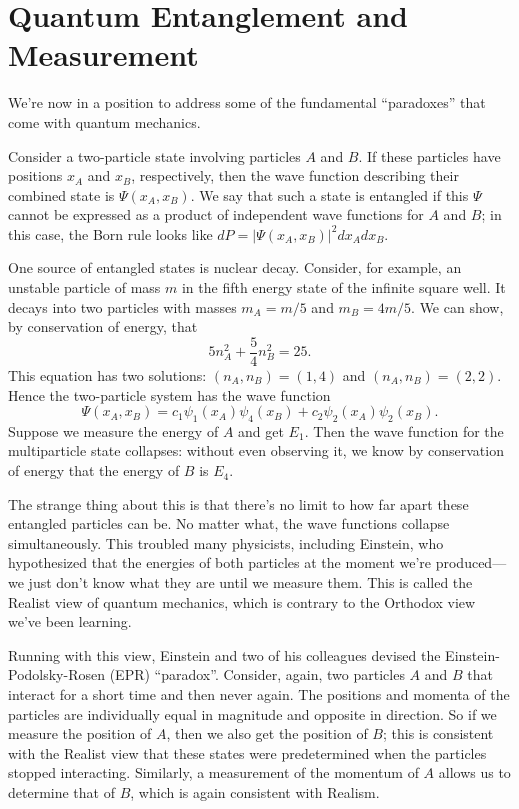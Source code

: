 \documentclass[../p052main.tex]{subfiles}
\begin{document}
\section{Quantum Entanglement and Measurement}
We're now in a position to address some of the fundamental ``paradoxes'' that come with quantum mechanics.

Consider a two-particle state involving particles $A$ and $B$.
If these particles have positions $x_A$ and $x_B$, respectively, then the wave function describing their combined state is $\Psi(x_A, x_B)$.
We say that such a state is entangled if this $\Psi$ cannot be expressed as a product of independent wave functions for $A$ and $B$; in this case, the Born rule looks like $dP = |\Psi(x_A, x_B)|^2 dx_A dx_B$.

One source of entangled states is nuclear decay.
Consider, for example, an unstable particle of mass $m$ in the fifth energy state of the infinite square well.
It decays into two particles with masses $m_A = m / 5$ and $m_B = 4m / 5$.
We can show, by conservation of energy, that
\[ 5n_A^2 + \frac{5}{4}n_B^2 = 25. \]
This equation has two solutions: $(n_A, n_B) = (1, 4)$ and $(n_A, n_B) = (2, 2)$.
Hence the two-particle system has the wave function
\[ \Psi(x_A, x_B) = c_1 \psi_1(x_A) \psi_4(x_B) + c_2 \psi_2(x_A) \psi_2(x_B). \]
Suppose we measure the energy of $A$ and get $E_1$.
Then the wave function for the multiparticle state collapses: without even observing it, we know by conservation of energy that the energy of $B$ is $E_4$.

The strange thing about this is that there's no limit to how far apart these entangled particles can be.
No matter what, the wave functions collapse simultaneously.
This troubled many physicists, including Einstein, who hypothesized that the energies of both particles at the moment we're produced---we just don't know what they are until we measure them.
This is called the Realist view of quantum mechanics, which is contrary to the Orthodox view we've been learning.

Running with this view, Einstein and two of his colleagues devised the Einstein-Podolsky-Rosen (EPR) ``paradox''.
Consider, again, two particles $A$ and $B$ that interact for a short time and then never again.
The positions and momenta of the particles are individually equal in magnitude and opposite in direction.
So if we measure the position of $A$, then we also get the position of $B$; this is consistent with the Realist view that these states were predetermined when the particles stopped interacting.
Similarly, a measurement of the momentum of $A$ allows us to determine that of $B$, which is again consistent with Realism.
\end{document}
